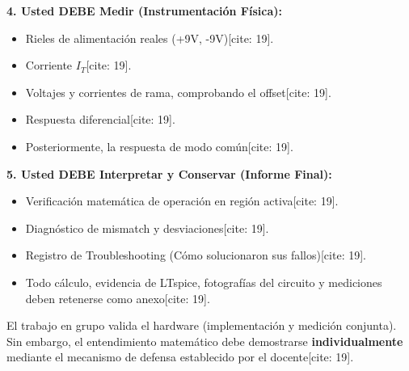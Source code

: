 \documentclass[11pt, a4paper]{article}
\begin{document}
\textbf{4. Usted DEBE Medir (Instrumentación Física):}
\begin{itemize}
    \item Rieles de alimentación reales (+9V, -9V)[cite: 19].
    \item Corriente $I_T$[cite: 19].
    \item Voltajes y corrientes de rama, comprobando el offset[cite: 19].
    \item Respuesta diferencial[cite: 19].
    \item Posteriormente, la respuesta de modo común[cite: 19].
\end{itemize}

\textbf{5. Usted DEBE Interpretar y Conservar (Informe Final):}
\begin{itemize}
    \item Verificación matemática de operación en región activa[cite: 19].
    \item Diagnóstico de mismatch y desviaciones[cite: 19].
    \item Registro de Troubleshooting (Cómo solucionaron sus fallos)[cite: 19].
    \item Todo cálculo, evidencia de LTspice, fotografías del circuito y mediciones deben retenerse como anexo[cite: 19].
\end{itemize}

\vspace{0.5cm}
\begin{tcolorbox}[colback=red!5, colframe=red!70!black, title=\textbf{Defensa Individual vs Grupal}]
    El trabajo en grupo valida el hardware (implementación y medición conjunta). Sin embargo, el entendimiento matemático debe demostrarse \textbf{individualmente} mediante el mecanismo de defensa establecido por el docente[cite: 19].
\end{tcolorbox}
\end{document}
